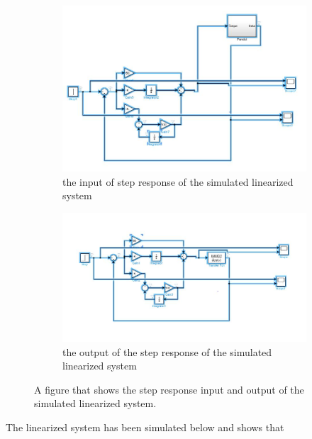 \documentclass[12pt]{article}
\begin{document}
\begin{figure}[H]
\centering
\begin{subfigure}{0.5\textwidth}
  \centering
  \includegraphics[width=1\linewidth]{images/ulin_simu.jpg}
  \caption{the input of step response of the simulated linearized system} \label{my_input_step_li}
\end{subfigure}%
\begin{subfigure}{0.5\textwidth}
  \centering
  \includegraphics[width=1\linewidth]{images/lin_simu.jpg}
  \caption{the output of the step response of the simulated linearized system} \label{my_output_step_li}
\end{subfigure}
\caption{A figure that shows the step response input and output of the simulated linearized system.}
\label{fig:step_li}
\end{figure}

The linearized system has been simulated below and shows that
\end{document}
